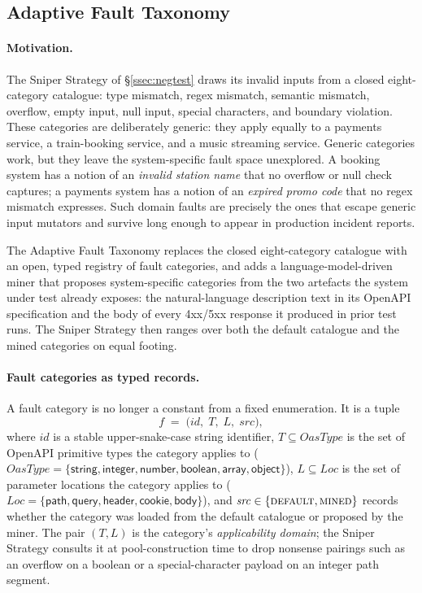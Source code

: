 \documentclass[conference]{IEEEtran}
\begin{document}
\subsection{Adaptive Fault Taxonomy}\label{ssec:adaptfault}

\paragraph{Motivation.}
The Sniper Strategy of \S\ref{ssec:negtest} draws its invalid inputs from a closed eight-category catalogue: type mismatch, regex mismatch, semantic mismatch, overflow, empty input, null input, special characters, and boundary violation. These categories are deliberately generic: they apply equally to a payments service, a train-booking service, and a music streaming service. Generic categories work, but they leave the system-specific fault space unexplored. A booking system has a notion of an \emph{invalid station name} that no overflow or null check captures; a payments system has a notion of an \emph{expired promo code} that no regex mismatch expresses. Such domain faults are precisely the ones that escape generic input mutators and survive long enough to appear in production incident reports.

The Adaptive Fault Taxonomy replaces the closed eight-category catalogue with an open, typed registry of fault categories, and adds a language-model-driven miner that proposes system-specific categories from the two artefacts the system under test already exposes: the natural-language description text in its OpenAPI specification and the body of every 4xx/5xx response it produced in prior test runs. The Sniper Strategy then ranges over both the default catalogue and the mined categories on equal footing.

\paragraph{Fault categories as typed records.}
A fault category is no longer a constant from a fixed enumeration. It is a tuple
\[
  f \;=\; \big(\mathit{id},\; T,\; L,\; \mathit{src}\big),
\]
where $\mathit{id}$ is a stable upper-snake-case string identifier, $T \subseteq \mathit{OasType}$ is the set of OpenAPI primitive types the category applies to ($\mathit{OasType} = \{\textsf{string}, \textsf{integer}, \textsf{number}, \textsf{boolean}, \textsf{array}, \textsf{object}\}$), $L \subseteq \mathit{Loc}$ is the set of parameter locations the category applies to ($\mathit{Loc} = \{\textsf{path}, \textsf{query}, \textsf{header}, \textsf{cookie}, \textsf{body}\}$), and $\mathit{src} \in \{\textsc{default}, \textsc{mined}\}$ records whether the category was loaded from the default catalogue or proposed by the miner. The pair $(T, L)$ is the category's \emph{applicability domain}; the Sniper Strategy consults it at pool-construction time to drop nonsense pairings such as an overflow on a boolean or a special-character payload on an integer path segment.
\end{document}
